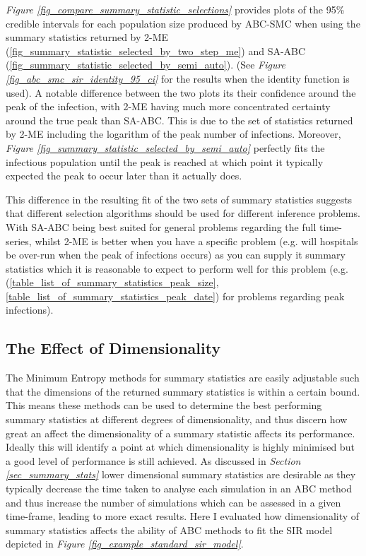 \documentclass[11pt,a4paper]{article}
\theoremstyle{break}
\begin{document}
  \textit{Figure \ref{fig_compare_summary_statistic_selections}} provides plots of the 95\% credible intervals for each population size produced by ABC-SMC when using the summary statistics returned by 2-ME (\ref{fig_summary_statistic_selected_by_two_step_me}) and SA-ABC (\ref{fig_summary_statistic_selected_by_semi_auto}). (See \textit{Figure \ref{fig_abc_smc_sir_identity_95_ci}} for the results when the identity function is used). A notable difference between the two plots its their confidence around the peak of the infection, with 2-ME having much more concentrated certainty around the true peak than SA-ABC. This is due to the set of statistics returned by 2-ME including the logarithm of the peak number of infections. Moreover, \textit{Figure \ref{fig_summary_statistic_selected_by_semi_auto}} perfectly fits the infectious population until the peak is reached at which point it typically expected the peak to occur later than it actually does.

  \par This difference in the resulting fit of the two sets of summary statistics suggests that different selection algorithms should be used for different inference problems. With SA-ABC being best suited for general problems regarding the full time-series, whilst 2-ME is better when you have a specific problem (e.g. will hospitals be over-run when the peak of infections occurs) as you can supply it summary statistics which it is reasonable to expect to perform well for this problem (e.g. (\ref{table_list_of_summary_statistics_peak_size},\ref{table_list_of_summary_statistics_peak_date}) for problems regarding peak infections).

\subsection{The Effect of Dimensionality}\label{sec_effect_of_dimensionality}

  \par The Minimum Entropy methods for summary statistics are easily adjustable such that the dimensions of the returned summary statistics is within a certain bound. This means these methods can be used to determine the best performing summary statistics at different degrees of dimensionality, and thus discern how great an affect the dimensionality of a summary statistic affects its performance. Ideally this will identify a point at which dimensionality is highly minimised but a good level of performance is still achieved. As discussed in \textit{Section \ref{sec_summary_stats}} lower dimensional summary statistics are desirable as they typically decrease the time taken to analyse each simulation in an ABC method and thus increase the number of simulations which can be assessed in a given time-frame, leading to more exact results. Here I evaluated how dimensionality of summary statistics affects the ability of ABC methods to fit the SIR model depicted in \textit{Figure \ref{fig_example_standard_sir_model}}.
\end{document}
